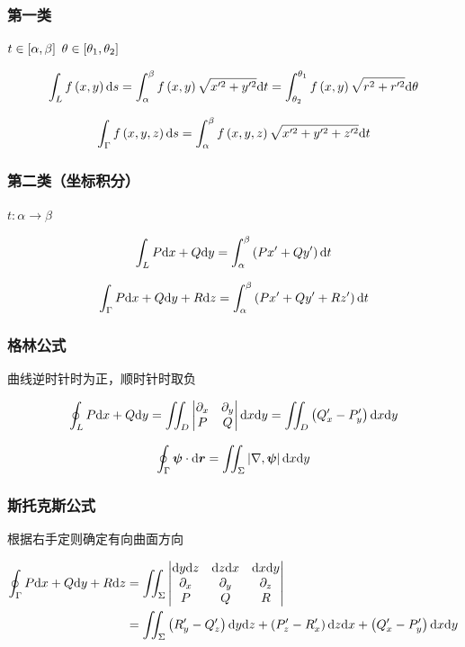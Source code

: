 \documentclass{article}
\begin{document}
\subsubsection{第一类}

$t\in\left[\alpha,\beta\right]$
$\theta\in\left[\theta_1,\theta_2\right]$

\[\int_L f\left(x,y\right)\mathrm d s
    =\int^\beta_\alpha f\left(x,y\right)\sqrt{x^{\prime 2}+y^{\prime 2}}\mathrm d t
    =\int_{\theta_2}^{\theta_1}f\left(x,y\right)\sqrt{r^2+r^{\prime2}}\mathrm d\theta\]

\[\int_\Gamma f\left(x,y,z\right)\mathrm d s
    =\int^\beta_\alpha f\left(x,y,z\right)\sqrt{x^{\prime 2}+y^{\prime 2}+z^{\prime 2}}\mathrm d t\]

\subsubsection{第二类（坐标积分）}

$t:\alpha\to\beta$

\[\int_LP\mathrm d x+Q\mathrm d y=
    \int^\beta_\alpha\left(Px^\prime+Qy^\prime\right)\mathrm d t\]

\[\int_\Gamma P\mathrm d x+Q\mathrm d y+R\mathrm d z=
    \int^\beta_\alpha\left(Px^\prime+Qy^\prime+Rz^\prime\right)\mathrm d t\]

\subsubsection{格林公式}

曲线逆时针时为正，顺时针时取负

\[\oint_LP\mathrm d x+Q\mathrm d y
    =\iint_D\begin{vmatrix}
        \partial_x & \partial_y \\
        P          & Q
    \end{vmatrix}\mathrm d x\mathrm d y
    =\iint_D\left(Q^\prime_x-P^\prime_y\right)\mathrm d x\mathrm d y\]

\[\oint_\Gamma\boldsymbol\psi\cdot\mathrm d\boldsymbol r
    =\iint_\Sigma\left|\nabla,\boldsymbol\psi\right|\mathrm d x\mathrm d y\]

\subsubsection{斯托克斯公式}

根据右手定则确定有向曲面方向

\[\begin{aligned}
        \oint_\Gamma P\mathrm d x+Q\mathrm d y+R\mathrm d z
         & =\iint_\Sigma\begin{vmatrix}
                            \mathrm d y\mathrm d z   & \mathrm d z\mathrm d x   & \mathrm d x\mathrm d y   \\
                            \partial_x & \partial_y & \partial_z \\
                            P          & Q          & R
                        \end{vmatrix} \\
         & =\iint_\Sigma
        \left(R_y^\prime-Q_z^\prime\right)\mathrm d y\mathrm d z+
        \left(P_z^\prime-R_x^\prime\right)\mathrm d z\mathrm d x+
        \left(Q_x^\prime-P_y^\prime\right)\mathrm d x\mathrm d y
    \end{aligned}\]
\end{document}
